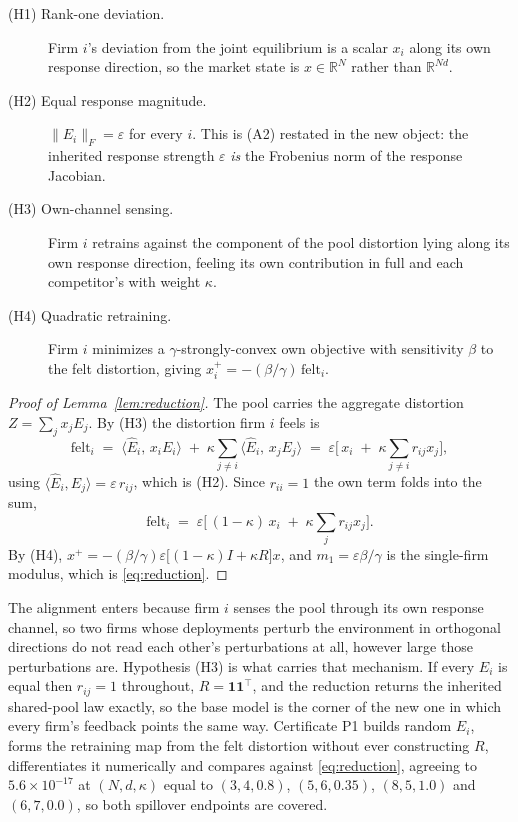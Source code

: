 \begin{description}
\item[(H1) Rank-one deviation.] Firm $i$'s deviation from the joint equilibrium is a scalar $x_i$ along its own response direction, so the market state is $x \in \mathbb{R}^N$ rather than $\mathbb{R}^{Nd}$.
\item[(H2) Equal response magnitude.] $\|E_i\|_F = \varepsilon$ for every $i$. This is (A2) restated in the new object: the inherited response strength $\varepsilon$ \emph{is} the Frobenius norm of the response Jacobian.
\item[(H3) Own-channel sensing.] Firm $i$ retrains against the component of the pool distortion lying along its own response direction, feeling its own contribution in full and each competitor's with weight $\kappa$.
\item[(H4) Quadratic retraining.] Firm $i$ minimizes a $\gamma$-strongly-convex own objective with sensitivity $\beta$ to the felt distortion, giving $x_i^{+} = -(\beta/\gamma)\,\mathrm{felt}_i$.
\end{description}

\begin{proof}[Proof of Lemma~\ref{lem:reduction}]
The pool carries the aggregate distortion $Z = \sum_j x_j E_j$. By (H3) the distortion firm $i$ feels is
\[
  \mathrm{felt}_i \;=\; \langle \hat{E}_i,\, x_i E_i\rangle \;+\; \kappa \sum_{j \neq i} \langle \hat{E}_i,\, x_j E_j\rangle
  \;=\; \varepsilon\Big[\, x_i \;+\; \kappa \sum_{j\neq i} r_{ij} x_j \Big],
\]
using $\langle \hat{E}_i, E_j\rangle = \varepsilon\, r_{ij}$, which is (H2). Since $r_{ii}=1$ the own term folds into the sum,
\[
  \mathrm{felt}_i \;=\; \varepsilon\Big[\,(1-\kappa)\, x_i \;+\; \kappa \sum_j r_{ij} x_j \Big].
\]
By (H4), $x^{+} = -(\beta/\gamma)\varepsilon\big[(1-\kappa)I + \kappa R\big]x$, and $m_1 = \varepsilon\beta/\gamma$ is the single-firm modulus, which is \eqref{eq:reduction}.
\end{proof}

The alignment enters because firm $i$ senses the pool through its own response channel, so two firms whose deployments perturb the environment in orthogonal directions do not read each other's perturbations at all, however large those perturbations are. Hypothesis (H3) is what carries that mechanism. If every $E_i$ is equal then $r_{ij}=1$ throughout, $R = \mathbf{1}\mathbf{1}^{\top}$, and the reduction returns the inherited shared-pool law exactly, so the base model is the corner of the new one in which every firm's feedback points the same way. Certificate P1 builds random $E_i$, forms the retraining map from the felt distortion without ever constructing $R$, differentiates it numerically and compares against \eqref{eq:reduction}, agreeing to $5.6\times 10^{-17}$ at $(N,d,\kappa)$ equal to $(3,4,0.8)$, $(5,6,0.35)$, $(8,5,1.0)$ and $(6,7,0.0)$, so both spillover endpoints are covered.

